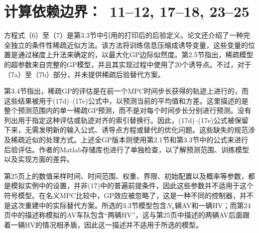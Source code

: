 \documentclass{article}
\begin{document}
\section*{计算依赖边界：\ 11–12, 17–18, 23–25}
方程式（6）至（7）是第3.3节中引用的打印后的后验定义。论文还介绍了一种完全独立的条件性稀疏近似方法。该方法将训练信息压缩成诱导变量，这些变量的位置是通过梯度上升法来确定的，以最大化GP边际似然度。第2.5节指出，稀疏模型的超参数来自完整的GP模型，并且其实现过程中使用了20个诱导点。不过，对于（7a）至（7b）部分，并未提供稀疏后验替代方案。

第3.4节指出，稀疏GP的评估是在前一个MPC时间步长获得的轨迹上进行的，而这些结果被用于(17d)–(17e)公式中，以预测当前的平均值和方差。这里描述的是整个预测范围内的单一稀疏GP预测，而不是对每个时间步长分别进行预测。没有列出用于指定这种评估或轨迹对齐的索引替换行。因此，(17d)–(17e)公式被保留下来，无需发明新的输入公式、诱导点方程或替代的优化问题。这些缺失的规范涉及稀疏近似的处理方式。上述全GP版本则使用第2.1节和第3.3节中的公式来进行后验评估。作者的Matlab存储库也进行了单独检查，以了解预测范围、训练模型以及实现方面的差异。

第25页上的数值采样时间、时间范围、权重、界限、初始配置以及概率等参数，都是模拟实例中的设置，并非(17)中的普遍前提条件，因此这些参数并不适用于这个符号模型。在名义MPC比较中，GP效应被忽略了，这是一种不同的控制器，并不是这次重建中的实际替代方案。所选的3.3节模型包含$N_a$辆AV和一辆HV；而第24页中的描述称模拟的AV车队包含“两辆HV”，这与第25页中描述的两辆AV后面跟着一辆HV的情况相矛盾，因此这一描述并不适用于所选的模型。
\end{document}
